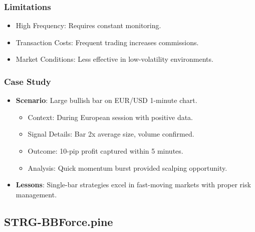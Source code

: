 \documentclass[12pt]{article}
\begin{document}
\subsubsection{Limitations}
\begin{itemize}
\item High Frequency: Requires constant monitoring.
\item Transaction Costs: Frequent trading increases commissions.
\item Market Conditions: Less effective in low-volatility environments.
\end{itemize}

\subsubsection{Case Study}
\begin{itemize}
\item \textbf{Scenario}: Large bullish bar on EUR/USD 1-minute chart.
  \begin{itemize}
  \item Context: During European session with positive data.
  \item Signal Details: Bar 2x average size, volume confirmed.
  \item Outcome: 10-pip profit captured within 5 minutes.
  \item Analysis: Quick momentum burst provided scalping opportunity.
  \end{itemize}
\item \textbf{Lessons}: Single-bar strategies excel in fast-moving markets with proper risk management.
\end{itemize}

\subsection{STRG-BBForce.pine}
\label{subsec:strg_bbforce}
\end{document}

